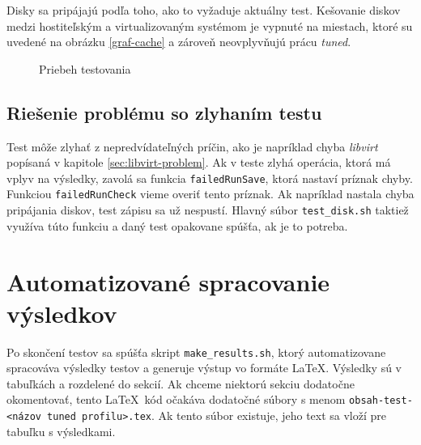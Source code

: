 Disky sa pripájajú podľa toho, ako to vyžaduje aktuálny test. Kešovanie diskov
medzi hostiteľským a virtualizovaným systémom je vypnuté na miestach, ktoré su
uvedené na obrázku \ref{graf-cache} a zároveň neovplyvňujú prácu \emph{tuned}. 

%
%

\begin{figure}[ht]
\begin{center}
  \caption{Priebeh testovania}
  \label{pic:testflow}
\end{center}
\end{figure}
%
%

\subsection{Riešenie problému so zlyhaním testu}
\label{sec:test-failure}

Test môže zlyhať z nepredvídateľných príčin, ako je napríklad chyba
\emph{libvirt} popísaná v kapitole \ref{sec:libvirt-problem}. Ak v teste zlyhá
operácia, ktorá má vplyv na výsledky, zavolá sa funkcia \texttt{failedRunSave},
ktorá nastaví príznak chyby. Funkciou \texttt{failedRunCheck} vieme overiť
tento príznak. Ak napríklad nastala chyba pripájania diskov, test zápisu sa už
nespustí. Hlavný súbor \texttt{test\_disk.sh} taktiež využíva túto funkciu a
daný test opakovane spúšťa, ak je to potreba.


\section{Automatizované spracovanie výsledkov}

Po skončení testov sa spúšťa skript \texttt{make\_results.sh}, ktorý
automatizovane spracováva výsledky testov a generuje výstup vo formáte \LaTeX.
Výsledky sú v tabuľkách a rozdelené do sekcií. Ak chceme niektorú sekciu
dodatočne okomentovať, tento \LaTeX~kód očakáva dodatočné súbory s menom
\texttt{obsah-test-<názov tuned profilu>.tex}. Ak tento súbor existuje, jeho
text sa vloží pre tabuľku s výsledkami.


